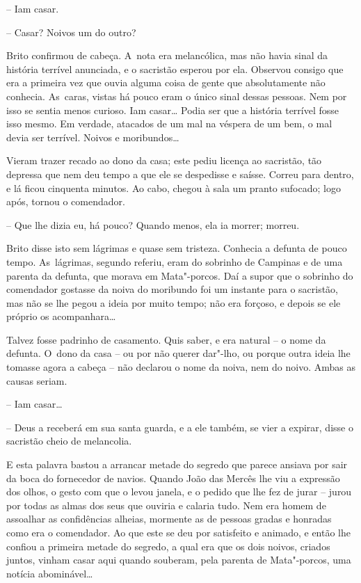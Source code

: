 -- Iam casar.

-- Casar? Noivos um do outro?

Brito confirmou de cabeça. A~nota era melancólica, mas não havia sinal
da história terrível anunciada, e o sacristão esperou por ela. Observou
consigo que era a primeira vez que ouvia alguma coisa de gente que
absolutamente não conhecia. As~caras, vistas há pouco eram o único sinal
dessas pessoas. Nem por isso se sentia menos curioso. Iam casar\ldots{} Podia
ser que a história terrível fosse isso mesmo. Em verdade, atacados de um
mal na véspera de um bem, o mal devia ser terrível. Noivos e
moribundos\ldots{}

Vieram trazer recado ao dono da casa; este pediu licença ao sacristão,
tão depressa que nem deu tempo a que ele se despedisse e saísse. Correu
para dentro, e lá ficou cinquenta minutos. Ao cabo, chegou à sala um
pranto sufocado; logo após, tornou o comendador.

-- Que lhe dizia eu, há pouco? Quando menos, ela ia morrer; morreu.

Brito disse isto sem lágrimas e quase sem tristeza. Conhecia a defunta
de pouco tempo. As~lágrimas, segundo referiu, eram do sobrinho de
Campinas e de uma parenta da defunta, que morava em Mata"-porcos. Daí a
supor que o sobrinho do comendador gostasse da noiva do moribundo foi um
instante para o sacristão, mas não se lhe pegou a ideia por muito tempo;
não era forçoso, e depois se ele próprio os acompanhara\ldots{}

Talvez fosse padrinho de casamento. Quis saber, e era natural -- o nome
da defunta. O~dono da casa -- ou por não querer dar"-lho, ou porque outra
ideia lhe tomasse agora a cabeça -- não declarou o nome da noiva, nem do
noivo. Ambas as causas seriam.

-- Iam casar\ldots{}

-- Deus a receberá em sua santa guarda, e a ele também, se vier a
expirar, disse o sacristão cheio de melancolia.

E esta palavra bastou a arrancar metade do segredo que parece ansiava
por sair da boca do fornecedor de navios. Quando João das Mercês lhe viu
a expressão dos olhos, o gesto com que o levou janela, e o pedido que
lhe fez de jurar -- jurou por todas as almas dos seus que ouviria e
calaria tudo. Nem era homem de assoalhar as confidências alheias,
mormente as de pessoas gradas e honradas como era o comendador. Ao que
este se deu por satisfeito e animado, e então lhe confiou a primeira
metade do segredo, a qual era que os dois noivos, criados juntos, vinham
casar aqui quando souberam, pela parenta de Mata"-porcos, uma notícia
abominável\ldots{}

